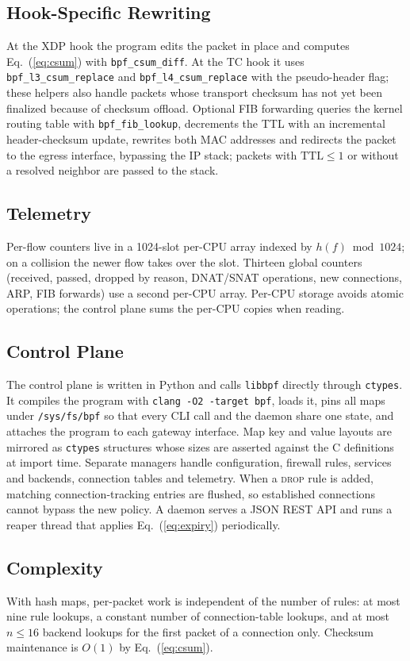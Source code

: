\documentclass[conference]{IEEEtran}
\begin{document}
\subsection{Hook-Specific Rewriting}
At the XDP hook the program edits the packet in place and computes
Eq.~(\ref{eq:csum}) with \texttt{bpf\_csum\_diff}. At the TC hook it uses
\texttt{bpf\_l3\_csum\_replace} and \texttt{bpf\_l4\_csum\_replace} with the
pseudo-header flag; these helpers also handle packets whose transport checksum
has not yet been finalized because of checksum offload. Optional FIB
forwarding queries the kernel routing table with \texttt{bpf\_fib\_lookup},
decrements the TTL with an incremental header-checksum update, rewrites both
MAC addresses and redirects the packet to the egress interface, bypassing the
IP stack; packets with $\mathrm{TTL}\le1$ or without a resolved neighbor are
passed to the stack.

\subsection{Telemetry}
Per-flow counters live in a 1024-slot per-CPU array indexed by
$h(f) \bmod 1024$; on a collision the newer flow takes over the slot. Thirteen
global counters (received, passed, dropped by reason, DNAT/SNAT operations,
new connections, ARP, FIB forwards) use a second per-CPU array. Per-CPU
storage avoids atomic operations; the control plane sums the per-CPU copies
when reading.

\subsection{Control Plane}
The control plane is written in Python and calls \texttt{libbpf} directly
through \texttt{ctypes}. It compiles the program with
\texttt{clang -O2 -target bpf}, loads it, pins all maps under
\texttt{/sys/fs/bpf} so that every CLI call and the daemon share one state,
and attaches the program to each gateway interface. Map key and value layouts
are mirrored as \texttt{ctypes} structures whose sizes are asserted against
the C definitions at import time. Separate managers handle configuration,
firewall rules, services and backends, connection tables and telemetry. When
a \textsc{drop} rule is added, matching connection-tracking entries are
flushed, so established connections cannot bypass the new policy. A daemon
serves a JSON REST API and runs a reaper thread that applies
Eq.~(\ref{eq:expiry}) periodically.

\subsection{Complexity}
With hash maps, per-packet work is independent of the number of rules: at
most nine rule lookups, a constant number of connection-table lookups, and at
most $n \le 16$ backend lookups for the first packet of a connection only.
Checksum maintenance is $O(1)$ by Eq.~(\ref{eq:csum}).
\end{document}
